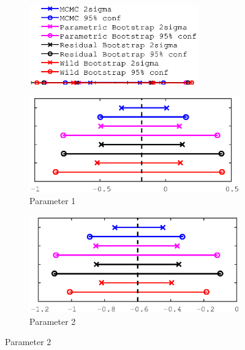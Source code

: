 \documentclass[11pt,a4paper,oneside]{report}
\begin{document}
\begin{figure}[H]
   \centering
    \begin{subfigure}[b]{0.5\textwidth}
    \includegraphics[width=0.8\textwidth, trim=0 15 0 0,clip=true]{figures/task5/uncert_legend.eps}
  \end{subfigure}%
  
  \begin{subfigure}[b]{0.5\textwidth}
    \includegraphics[width=\textwidth, trim=0 0 0 0,clip=true]{figures/task5/uncert_model3_param1.eps}
    \caption{Parameter 1}
  \end{subfigure}%
  \begin{subfigure}[b]{0.5\textwidth}
    \includegraphics[width=\textwidth, trim=0 0 0 0,clip=true]{figures/task5/uncert_model3_param2.eps}
    \caption{Parameter 2}
  \end{subfigure}%
  

\end{figure}
\end{document}
